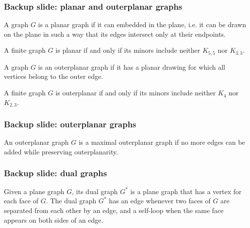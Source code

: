 \documentclass[xetex,mathserif,serif]{beamer}
\begin{document}
\begin{frame}
  \frametitle{Backup slide: planar and outerplanar graphs}

  \begin{definition}
    A graph \(G\) is a planar graph if it can embedded in the plane, i.e. it can be drawn on the plane in such a way that its edges intersect only at their endpoints.
  \end{definition}

  \begin{definition}
    A finite graph \(G\) is planar if and only if its minors include neither \(K_{5,5}\) nor \(K_{3, 3}\).
  \end{definition}

  \begin{definition}
    A graph \(G\) is an outerplanar graph if it has a planar drawing for which all vertices belong to the outer edge.
  \end{definition}

  \begin{definition}
    A finite graph \(G\) is outerplanar if and only if its minors include neither \(K_4\) nor \(K_{2, 3}\).
  \end{definition}
\end{frame}

\begin{frame}
  \frametitle{Backup slide: outerplanar graphs}

  \begin{definition}
    An outerplanar graph \(G\) is a maximal outerplanar graph if no more edges can be added while preserving outerplanarity.
  \end{definition}
\end{frame}

\begin{frame}
  \frametitle{Backup slide: dual graphs}

  \begin{definition}
    Given a plane graph \(G\), its dual graph \(G^*\) is a plane graph that has a vertex for each face of \(G\). The dual graph \(G^*\) has an edge whenever two faces of \(G\) are separated from each other by an edge, and a self-loop when the same face appears on both sides of an edge.
  \end{definition}
\end{frame}
\end{document}
